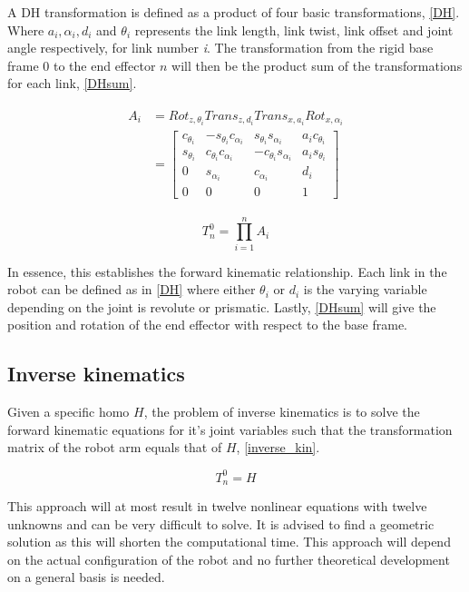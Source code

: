 A DH transformation is defined as a product of four basic transformations, \eqref{DH}. Where $a_i, \alpha_i, d_i $ and $\theta_i$ represents the link length, link twist, link offset and joint angle respectively, for link number \textit{i}. The transformation from the rigid base frame $0$ to the end effector $n$ will then be the product sum of the transformations for each link, \eqref{DHsum}.

\begin{align}\label{DH}
\begin{split}
A_i &= Rot_{z,\theta_i}Trans_{z,d_i}Trans_{x,a_i}Rot_{x,\alpha_i} \\
&= \begin{bmatrix}
c_{\theta_i} & -s_{\theta_i}c_{\alpha_i} & s_{\theta_i}s_{\alpha_i} & a_{i}c_{\theta_i} \\ 
s_{\theta_i} & c_{\theta_i}c_{\alpha_i} & -c_{\theta_i}s_{\alpha_i} & a_{i}s_{\theta_i} \\ 
0 & s_{\alpha_i} & c_{\alpha_i} & d_i \\ 
0 & 0 & 0 & 1 
\end{bmatrix}
\end{split}
\end{align}

\begin{equation}\label{DHsum}
T^0_n=\prod_{i=1}^{n}A_i
\end{equation}

In essence, this establishes the forward kinematic relationship. Each link in the robot can be defined as in \eqref{DH} where either $\theta_i$ or $d_i$ is the varying variable depending on the joint is revolute or prismatic. Lastly, \eqref{DHsum} will give the position and rotation of the end effector with respect to the base frame.

\subsection{Inverse kinematics}

Given a specific \gls{homo} $H$, the problem of inverse kinematics is to solve the forward kinematic equations for it's joint variables such that the transformation matrix of the robot arm equals that of $H$, \eqref{inverse_kin}.

\begin{equation}\label{inverse_kin}
T^0_n = H
\end{equation}

This approach will at most result in twelve nonlinear equations with twelve unknowns and can be very difficult to solve. It is advised to find a geometric solution as this will shorten the computational  time. This approach will depend on the actual configuration of the robot and no further theoretical development on a general basis is needed.


